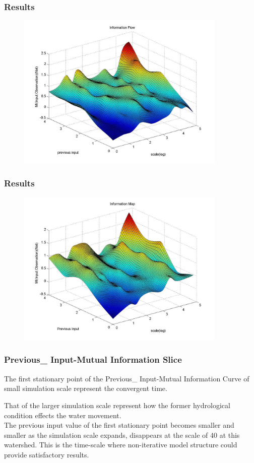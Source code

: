 \documentclass{beamer}
\begin{document}
\begin{frame}
\frametitle{Results}
\begin{figure}[htbp]
\centering
\includegraphics[width=10cm]{2.jpg}
\end{figure}
\end{frame}

\begin{frame}
\frametitle{Results}
\begin{figure}[htbp]
\centering
\includegraphics[width=10cm]{3.jpg}
\end{figure}
\end{frame}

\begin{frame}
\frametitle{Previous\_ Input-Mutual Information Slice}
The first stationary point of the Previous\_ Input-Mutual Information Curve of small simulation scale represent the convergent time. 

That of the larger simulation scale represent how the former hydrological condition effects the water movement.
\\

The previous input value of the first stationary point becomes smaller and smaller as the simulation scale expands, disappears at the scale of 40 at this watershed. This is the time-scale where non-iterative model structure could provide satisfactory results.
\end{frame}
\end{document}
